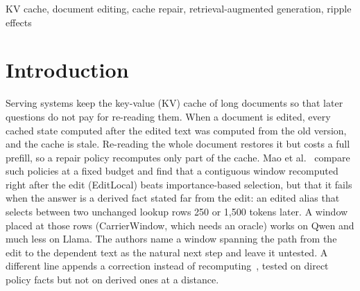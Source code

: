\documentclass[conference]{IEEEtran}
\begin{document}
\begin{IEEEkeywords}
KV cache, document editing, cache repair, retrieval-augmented generation, ripple effects
\end{IEEEkeywords}

\section{Introduction}

Serving systems keep the key-value (KV) cache of long documents so that later questions do not pay for
re-reading them. When a document is edited, every cached state computed after the edited text was computed
from the old version, and the cache is stale. Re-reading the whole document restores it but costs a full
prefill, so a repair policy recomputes only part of the cache. Mao et al.~\cite{mao2026contiguity} compare such
policies at a fixed budget and find that a contiguous window recomputed right after the edit (EditLocal) beats
importance-based selection, but that it fails when the answer is a derived fact stated far from the edit: an
edited alias that selects between two unchanged lookup rows 250 or 1,500 tokens later. A window placed at
those rows (CarrierWindow, which needs an oracle) works on Qwen and much less on Llama. The authors name a
window spanning the path from the edit to the dependent text as the natural next step and leave it untested.
A different line appends a correction instead of recomputing~\cite{li2026programmable}, tested on direct
policy facts but not on derived ones at a distance.
\end{document}
